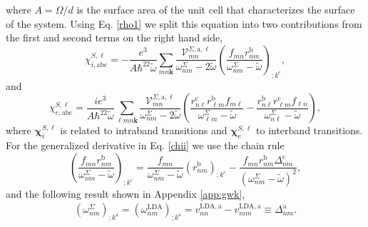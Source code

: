 where $A=\Omega/d$ is the surface area of the unit
cell that characterizes the surface of the system.
Using Eq. \eqref{rho1} we
split this equation into
two contributions from the first and second terms on the right hand side,
\begin{equation}\label{chii}
\chi_{i,\mathrm{abc}}^{S,\ell}
=-\frac{e^3}{A\hbar^22\tilde{\omega}}\sum_{mn\mathbf{k}}
\frac{\mathcal{V}_{mn}^{\Sigma,\mathrm{a},\ell}}{\omega^\Sigma_{nm}-2\tilde{\omega}}
\left(\frac{f_{mn}r_{nm}^{\mathrm{b}}}{\omega^\Sigma_{nm}-\tilde{\omega}}\right)_{;k^{\mathrm{c}}},
\end{equation} 
and 
\begin{equation}\label{chie}
\chi_{e,\mathrm{abc}}^{S,\ell}
=\frac{ie^3}{A\hbar^22\tilde{\omega}}\sum_{\ell mn\mathbf{k}}
\frac{\mathcal{V}_{mn}^{\Sigma,\mathrm{a},\ell}}{\omega^\Sigma_{nm}-2\tilde{\omega}}
\left(
\frac{r_{n\ell}^{\mathrm{c}} r_{\ell m}^{\mathrm{b}} 
f_{m\ell}}{\omega^\Sigma_{\ell m}-\tilde{\omega}}
-\frac{r_{n\ell}^{\mathrm{b}} r_{\ell m}^{\mathrm{c}} 
f_{\ell n}}{\omega^\Sigma_{n \ell}-\tilde{\omega}}
\right),
\end{equation} 
where $\boldsymbol{\chi}^{S,\ell}_i$
 is related to intraband transitions and
$\boldsymbol{\chi}^{S,\ell}_e$
to interband transitions.
For the generalized derivative in Eq. \eqref{chii} we use the chain rule 
\begin{equation}\label{gene2}
\left(\frac{f_{mn}r_{nm}^{\mathrm{b}}}{\omega^\Sigma_{nm}-\tilde{\omega}}\right)_{;k^{\mathrm{c}}}=
\frac{f_{mn}}{\omega^\Sigma_{nm}-\tilde{\omega}}\left(r_{nm}^{\mathrm{b}}\right)_{;k^{\mathrm{c}}}
-\frac{f_{mn}r_{nm}^{\mathrm{b}}\Delta_{nm}^\mathrm{c}}{(\omega^\Sigma_{nm}-\tilde{\omega})^2}
,
\end{equation}
and the following result
shown in Appendix \ref{app:gwk},
\begin{align}\label{eli.13}
\left(\omega^\Sigma_{nm}\right)_{;k^{\mathrm{a}}}
=
\left(\omega^{\mathrm{LDA}}_{nm}\right)_{;k^{\mathrm{a}}}
= 
v_{nn}^{\mathrm{LDA},\mathrm{a}}-v_{mm}^{\mathrm{LDA},\mathrm{a}}\equiv\Delta_{nm}^{\mathrm{a}}
.
\end{align} 

